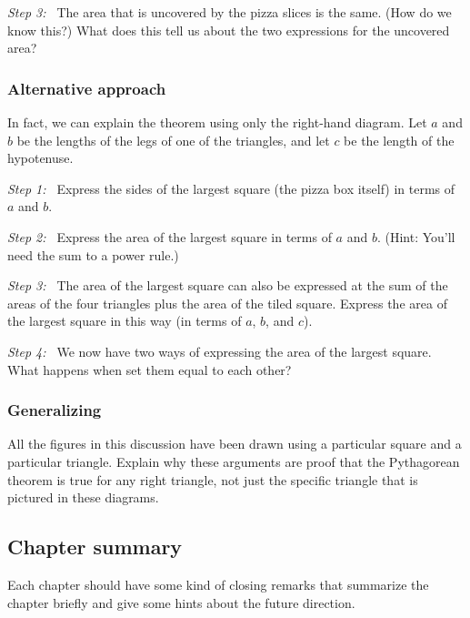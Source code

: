 \textit{Step 3:~} The area that is uncovered by the pizza slices is the same. (How do we know this?) What does this tell us about the two expressions for the uncovered area?

\subsubsection{Alternative approach}

In fact, we can explain the theorem using only the right-hand diagram. Let $a$ and $b$ be the lengths of the legs of one of the triangles, and let $c$ be the length of the hypotenuse.

\begin{center}
\end{center}

\textit{Step 1:~} Express the sides of the largest square (the pizza box itself) in terms of $a$ and $b$.

\textit{Step 2:~} Express the area of the largest square in terms of $a$ and $b$. (Hint: You'll need the sum to a power rule.)

\textit{Step 3:~} The area of the largest square can also be expressed at the sum of the areas of the four triangles plus the area of the tiled square. Express the area of the largest square in this way (in terms of $a$, $b$, and $c$).

\textit{Step 4:~} We now have two ways of expressing the area of the largest square. What happens when set them equal to each other?

\subsubsection{Generalizing}

All the figures in this discussion have been drawn using a particular square and a particular triangle. Explain why these arguments are proof that the Pythagorean theorem is true for any right triangle, not just the specific triangle that is pictured in these diagrams.


\subsection*{Chapter summary}

Each chapter should have some kind of closing remarks that summarize the chapter briefly and give some hints about the future direction.
